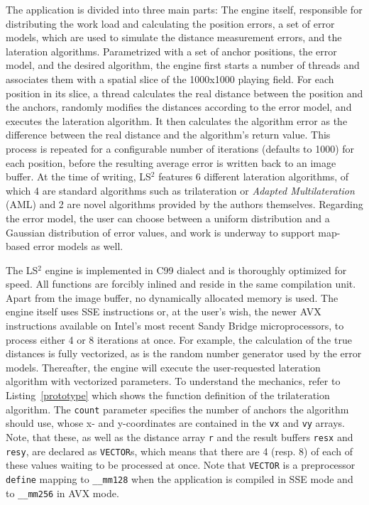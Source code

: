 The application is divided into three main parts: The engine itself, responsible for distributing the work load and calculating the position errors, a set of error models, which are used to simulate the distance measurement errors, and the lateration algorithms. Parametrized with a set of anchor positions, the error model, and the desired algorithm, the engine first starts a number of threads and associates them with a spatial slice of the 1000x1000 playing field. For each position in its slice, a thread calculates the real distance between the position and the anchors, randomly modifies the distances according to the error model, and executes the lateration algorithm. It then calculates the algorithm error as the difference between the real distance and the algorithm's return value. This process is repeated for a configurable number of iterations (defaults to 1000) for each position, before the resulting average error is written back to an image buffer. At the time of writing, LS$^{2}$ features 6 different lateration algorithms, of which 4 are standard algorithms such as trilateration or \emph{Adapted Multilateration} (AML) and 2 are novel algorithms provided by the authors themselves. Regarding the error model, the user can choose between a uniform distribution and a Gaussian distribution of error values, and work is underway to support map-based error models as well.

The LS$^{2}$ engine is implemented in C99 dialect and is thoroughly optimized for speed. All functions are forcibly inlined and reside in the same compilation unit. Apart from the image buffer, no dynamically allocated memory is used. The engine itself uses SSE instructions or, at the user's wish, the newer AVX instructions available on Intel's most recent Sandy Bridge microprocessors, to process either 4 or 8 iterations at once. For example, the calculation of the true distances is fully vectorized, as is the random number generator used by the error models. Thereafter, the engine will execute the user-requested lateration algorithm with vectorized parameters. To understand the mechanics, refer to Listing~\ref{prototype} which shows the function definition of the trilateration algorithm. The \texttt{count} parameter specifies the number of anchors the algorithm should use, whose x- and y-coordinates are contained in the \texttt{vx} and \texttt{vy} arrays. Note, that these, as well as the distance array \texttt{r} and the result buffers \texttt{resx} and \texttt{resy}, are declared as \texttt{VECTOR}s, which means that there are 4 (resp. 8) of each of these values waiting to be processed at once. Note that \texttt{VECTOR} is a preprocessor \texttt{define} mapping to \texttt{\_\_mm128} when the application is compiled in SSE mode and to \texttt{\_\_mm256} in AVX mode.

